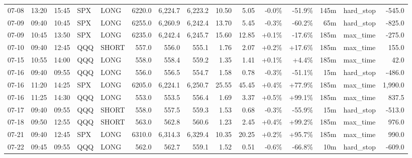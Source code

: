 \documentclass[11pt,a4paper,twoside]{article}
\begin{document}
\begin{landscape}
\begin{center}
\begin{longtable}{>{\color{txtmain}}l l l l l r r r r r r r r >{\color{txtmain}}l r}
07-08 & 13:20 & 15:45 & SPX & LONG & 6220.0 & 6,224.7 & 6,223.2 & 10.50 & 5.05 & \textcolor{lossred}{-0.0\%} & \textcolor{lossred}{-51.9\%} & 145m & hard\_stop & \textcolor{lossred}{-545.0} \\
07-09 & 09:40 & 10:45 & SPX & LONG & 6255.0 & 6,260.9 & 6,242.4 & 13.70 & 5.45 & \textcolor{lossred}{-0.3\%} & \textcolor{lossred}{-60.2\%} & 65m & hard\_stop & \textcolor{lossred}{-825.0} \\
07-09 & 10:45 & 13:50 & SPX & LONG & 6235.0 & 6,242.4 & 6,245.7 & 15.60 & 12.85 & \textcolor{wingreen}{+0.1\%} & \textcolor{lossred}{-17.6\%} & 185m & max\_time & \textcolor{lossred}{-275.0} \\
07-10 & 09:40 & 12:45 & QQQ & SHORT & 557.0 & 556.0 & 555.1 & 1.76 & 2.07 & \textcolor{wingreen}{+0.2\%} & \textcolor{wingreen}{+17.6\%} & 185m & max\_time & \textcolor{wingreen}{155.0} \\
07-15 & 10:55 & 14:00 & QQQ & LONG & 558.0 & 558.4 & 559.2 & 1.35 & 1.41 & \textcolor{wingreen}{+0.1\%} & \textcolor{wingreen}{+4.4\%} & 185m & max\_time & \textcolor{wingreen}{42.0} \\
07-16 & 09:40 & 09:55 & QQQ & LONG & 556.0 & 556.5 & 554.7 & 1.58 & 0.78 & \textcolor{lossred}{-0.3\%} & \textcolor{lossred}{-51.1\%} & 15m & hard\_stop & \textcolor{lossred}{-486.0} \\
07-16 & 11:20 & 14:25 & SPX & LONG & 6205.0 & 6,224.1 & 6,250.7 & 25.55 & 45.45 & \textcolor{wingreen}{+0.4\%} & \textcolor{wingreen}{+77.9\%} & 185m & max\_time & \textcolor{wingreen}{1,990.0} \\
07-16 & 11:25 & 14:30 & QQQ & LONG & 553.0 & 553.5 & 556.4 & 1.69 & 3.37 & \textcolor{wingreen}{+0.5\%} & \textcolor{wingreen}{+99.1\%} & 185m & max\_time & \textcolor{wingreen}{837.5} \\
07-17 & 09:40 & 09:55 & QQQ & SHORT & 558.0 & 557.5 & 559.3 & 1.53 & 0.68 & \textcolor{lossred}{-0.3\%} & \textcolor{lossred}{-55.9\%} & 15m & hard\_stop & \textcolor{lossred}{-513.0} \\
07-18 & 09:50 & 12:55 & QQQ & SHORT & 563.0 & 562.8 & 560.6 & 1.23 & 2.45 & \textcolor{wingreen}{+0.4\%} & \textcolor{wingreen}{+99.2\%} & 185m & max\_time & \textcolor{wingreen}{976.0} \\
07-21 & 09:40 & 12:45 & SPX & LONG & 6310.0 & 6,314.3 & 6,329.4 & 10.35 & 20.25 & \textcolor{wingreen}{+0.2\%} & \textcolor{wingreen}{+95.7\%} & 185m & max\_time & \textcolor{wingreen}{990.0} \\
07-22 & 09:45 & 09:55 & QQQ & LONG & 562.0 & 562.7 & 559.1 & 1.52 & 0.51 & \textcolor{lossred}{-0.6\%} & \textcolor{lossred}{-66.8\%} & 10m & hard\_stop & \textcolor{lossred}{-609.0} \\

\end{longtable}
\end{center}
\end{landscape}
\end{document}
